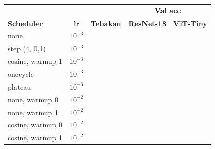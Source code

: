 \documentclass[t,aspectratio=169,xcolor={dvipsnames,table}]{beamer}
\begin{document}
\begin{frame}
\begin{columns}[T]
        \vspace{2pt}
        \scriptsize
        \setlength{\tabcolsep}{4pt}
        \renewcommand{\arraystretch}{1.25}
        \begin{tabular}{|l|c|c|c|c|}
            \rowcolor{dlSoftCloud} & & & \multicolumn{2}{c|}{\textbf{Val acc}} \\
            \rowcolor{dlSoftCloud} \textbf{Scheduler} & \textbf{lr} & \textbf{Tebakan} & \textbf{ResNet-18} & \textbf{ViT-Tiny} \\ \hline
            none & $10^{-3}$ & \hspace{0.75cm} & \hspace{0.75cm} & \hspace{0.75cm} \\ \hline
            step (4, 0,1) & $10^{-3}$ & \hspace{0.75cm} & \hspace{0.75cm} & \hspace{0.75cm} \\ \hline
            cosine, warmup 1 & $10^{-3}$ & \hspace{0.75cm} & \hspace{0.75cm} & \hspace{0.75cm} \\ \hline
            onecycle & $10^{-3}$ & \hspace{0.75cm} & \hspace{0.75cm} & \hspace{0.75cm} \\ \hline
            plateau & $10^{-3}$ & \hspace{0.75cm} & \hspace{0.75cm} & \hspace{0.75cm} \\ \hline
            none, warmup 0 & $10^{-2}$ & \hspace{0.75cm} & \hspace{0.75cm} & \hspace{0.75cm} \\ \hline
            none, warmup 1 & $10^{-2}$ & \hspace{0.75cm} & \hspace{0.75cm} & \hspace{0.75cm} \\ \hline
            cosine, warmup 0 & $10^{-2}$ & \hspace{0.75cm} & \hspace{0.75cm} & \hspace{0.75cm} \\ \hline
            cosine, warmup 1 & $10^{-2}$ & \hspace{0.75cm} & \hspace{0.75cm} & \hspace{0.75cm} \\ \hline
        \end{tabular}


\end{columns}
\end{frame}
\end{document}
